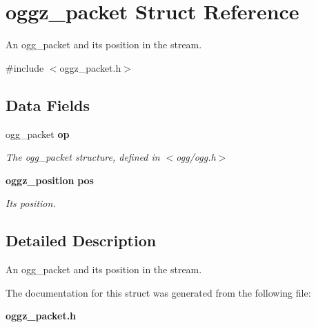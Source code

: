\section{oggz\-\_\-packet Struct Reference}
\label{structoggz__packet}


An ogg\-\_\-packet and its position in the stream.  




{\ttfamily \#include $<$oggz\-\_\-packet.\-h$>$}

\subsection*{Data Fields}
\begin{DoxyCompactItemize}
\item 
ogg\-\_\-packet {\bf op}\label{structoggz__packet_a36cb056219e68a383e7139ce0a2ff715}

\begin{DoxyCompactList}\small\item\em The ogg\-\_\-packet structure, defined in $<$ogg/ogg.\-h$>$ \end{DoxyCompactList}\item 
{\bf oggz\-\_\-position} {\bf pos}\label{structoggz__packet_a71d24b8fa94acf2511c0c6f7b24de546}

\begin{DoxyCompactList}\small\item\em Its position. \end{DoxyCompactList}\end{DoxyCompactItemize}


\subsection{Detailed Description}
An ogg\-\_\-packet and its position in the stream. 

The documentation for this struct was generated from the following file\-:\begin{DoxyCompactItemize}
\item 
{\bf oggz\-\_\-packet.\-h}\end{DoxyCompactItemize}
